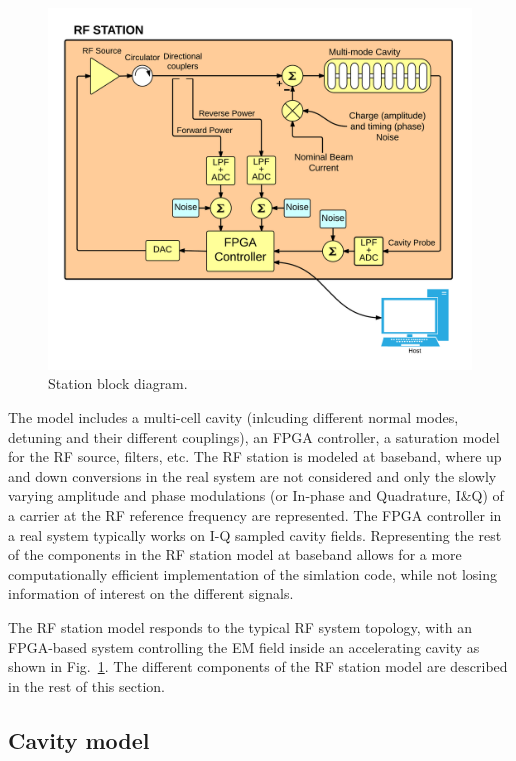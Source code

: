 \documentclass[a4paper,12pt]{article}
\begin{document}
\begin{figure}
\centering
\includegraphics[scale=0.75]{../figures/Station_rf_blocks.png}
\caption{Station block diagram.}
\label{fig:Station_block_diagram}
\end{figure}

The model includes a multi-cell cavity (inlcuding different normal modes, detuning and their different couplings), an FPGA controller, a saturation model for the RF source, filters, etc. The RF station is modeled at baseband, where up and down conversions in the real system are not considered and only the slowly varying amplitude and phase modulations (or In-phase and Quadrature, I\&Q) of a carrier at the RF reference frequency are represented. The FPGA controller in a real system typically works on I-Q sampled cavity fields. Representing the rest of the components in the RF station model at baseband allows for a more computationally efficient implementation of the simlation code, while not losing information of interest on the different signals. 

The RF station model responds to the typical RF system topology, with an FPGA-based system controlling the EM field inside an accelerating cavity as shown in Fig.~\ref{fig:Station_block_diagram}. The different components of the RF station model are described in the rest of this section.

\subsection{Cavity model}
\end{document}
